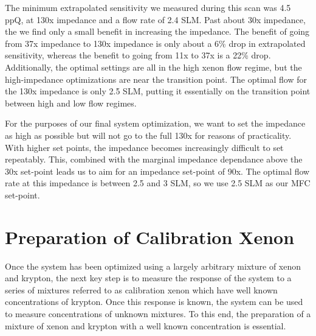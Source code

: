 The minimum extrapolated sensitivity we measured during this scan was 4.5 ppQ, at 130x impedance and a flow rate of 2.4 SLM. Past about 30x impedance, the we find only a small benefit in increasing the impedance. The benefit of going from 37x impedance to 130x impedance is only about a 6\% drop in extrapolated sensitivity, whereas the benefit to going from 11x to 37x is a 22\% drop. Additionally, the optimal settings are all in the high xenon flow regime, but the high-impedance optimizations are near the transition point. The optimal flow for the 130x impedance is only 2.5 SLM, putting it essentially on the transition point between high and low flow regimes.

For the purposes of our final system optimization, we want to set the impedance as high as possible but will not go to the full 130x for reasons of practicality. With higher set points, the impedance becomes increasingly difficult to set repeatably. This, combined with the marginal impedance dependance above the 30x  set-point leads us to aim for an impedance set-point of 90x. The optimal flow rate at this impedance is between 2.5 and 3 SLM, so we use 2.5 SLM as our MFC set-point.



\section{Preparation of Calibration Xenon}
\label{sec:calprep}
Once the system has been optimized using a largely arbitrary mixture of xenon and krypton, the next key step is to measure the response of the system to a series of mixtures referred to as calibration xenon which have well known concentrations of krypton. Once this response is known, the system can be used to measure concentrations of unknown mixtures. To this end, the preparation of a mixture of xenon and krypton with a well known concentration is essential.

